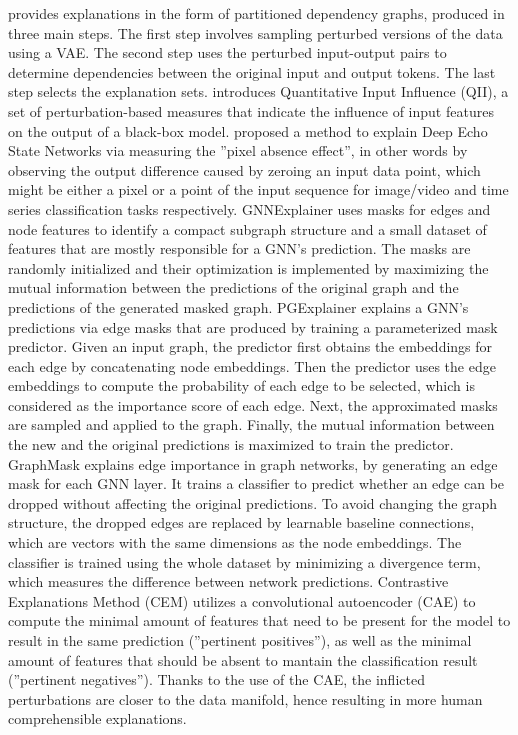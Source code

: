 \documentclass[journal]{IEEEtran}
\begin{document}
\cite{Alvarez-Melis2017} provides explanations in the form of partitioned dependency graphs, produced in three main steps. The first step involves sampling perturbed versions of the data using a VAE. The second step uses the perturbed input-output pairs to determine dependencies between the original input and output tokens. The last step selects the explanation sets.
\cite{Datta2017} introduces Quantitative Input Influence (QII), a set of perturbation-based measures that indicate the influence of input features on the output of a black-box model. 
\cite{Arrieta2021} proposed a method to explain Deep Echo State Networks via measuring the ''pixel absence effect'', in other words by observing the output difference caused by zeroing an input data point, which might be either a pixel or a point of the input sequence for image/video and time series classification tasks respectively.
GNNExplainer \cite{Ying2019} uses masks for edges and node features to identify a compact subgraph structure and a small dataset of features that are mostly responsible for a GNN’s prediction. The masks are randomly initialized and their optimization is implemented by maximizing the mutual information between the predictions of the original graph and the predictions of the generated masked graph.  
PGExplainer \cite{Luo2020} explains a GNN's predictions via edge masks that are produced by training a parameterized mask predictor. Given an input graph, the predictor first obtains the embeddings for each edge by concatenating node embeddings. Then the predictor uses the edge embeddings to compute the probability of each edge to be selected, which is considered as the importance score of each edge. Next, the approximated masks are sampled and applied to the graph. Finally, the mutual information between the new and the original predictions is maximized to train the predictor. 
GraphMask \cite{Schlichtkrull2020} explains edge importance in graph networks, by generating an edge mask for each GNN layer. It trains a classifier to predict whether an edge can be dropped without affecting the original predictions. To avoid changing the graph structure, the dropped edges are replaced by learnable baseline connections, which are vectors with the same dimensions as the node embeddings. The classifier is trained using the whole dataset by minimizing a divergence term, which measures the difference between network predictions. 
Contrastive Explanations Method (CEM) \cite{Dhurandhar2018} utilizes a convolutional autoencoder (CAE) to compute the minimal amount of features that need to be present for the model to result in the same prediction (''pertinent positives''), as well as the minimal amount of features that should be absent to mantain the classification result (''pertinent negatives''). Thanks to the use of the CAE, the inflicted perturbations are closer to the data manifold, hence resulting in more human comprehensible explanations.
\end{document}
